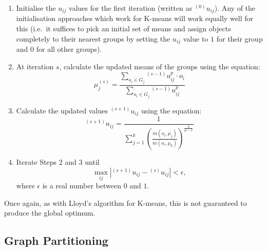 \begin{enumerate}

\item Initialise the $u_{ij}$ values for the first iteration (written as ${}^{(0)}u_{ij}$). Any of the initialisation approaches which work for K-means will work equally well for this (i.e.~it suffices to pick an initial set of means and assign objects completely to their nearest groups by setting the $u_{ij}$ value to $1$ for their group and $0$ for all other groups).

\item At iteration $s$, calculate the updated means of the groups using the equation:
%
\[
\mu_j^{(s)} = \frac{\displaystyle \sum_{o_i \in G_j} {}^{(s-1)}u_{ij}^p \cdot o_i}{\displaystyle \sum_{o_i \in G_j} {}^{(s-1)}u_{ij}^p}
\]

\item Calculate the updated values ${}^{(s+1)}u_{ij}$ using the equation:
%
\[
{}^{(s+1)}u_{ij} = \frac{1}{\displaystyle \sum_{j=1}^k \left( \frac{m(o_i, \mu_j)}{m(o_i, \mu_k)} \right)^{\frac{2}{p-1}}}
\]

\item Iterate Steps 2 and 3 until
%
\[
\max_{ij} |{}^{(s+1)}u_{ij} - {}^{(s)}u_{ij}| < \epsilon,
\]
%
where $\epsilon$ is a real number between $0$ and $1$.

\end{enumerate}

\noindent Once again, as with Lloyd's algorithm for K-means, this is not guaranteed to produce the global optimum.

\subsection{Graph Partitioning}
\label{subsec:graphpartitioning}

